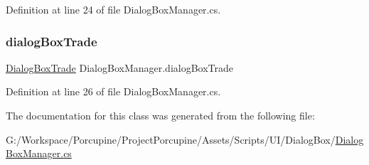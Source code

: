 Definition at line 24 of file Dialog\+Box\+Manager.\+cs.

\mbox{\label{class_dialog_box_manager_af9c33f03e3be79d94abfee7d6517bb82}} 
\subsubsection{\texorpdfstring{dialog\+Box\+Trade}{dialogBoxTrade}}
{\footnotesize\ttfamily \hyperlink{class_dialog_box_trade}{Dialog\+Box\+Trade} Dialog\+Box\+Manager.\+dialog\+Box\+Trade}



Definition at line 26 of file Dialog\+Box\+Manager.\+cs.



The documentation for this class was generated from the following file\+:\begin{DoxyCompactItemize}
\item 
G\+:/\+Workspace/\+Porcupine/\+Project\+Porcupine/\+Assets/\+Scripts/\+U\+I/\+Dialog\+Box/\hyperlink{_dialog_box_manager_8cs}{Dialog\+Box\+Manager.\+cs}\end{DoxyCompactItemize}
